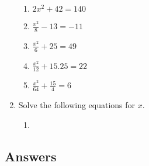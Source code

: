 \documentclass[a4paper,12pt]{article}
\begin{document}
\begin{enumerate}
\begin{multicols}{2}
\begin{enumerate}
    \item $2x^2 + 42 = 140$
    \item $\displaystyle \frac{x^2}{8}-13 = -11$
    \item $\displaystyle \frac{x^2}{6} + 25 = 49$
    \item $\displaystyle \frac{x^2}{12} + 15.25 = 22$
    \item $\displaystyle \frac{x^2}{64} + \frac{15}{4} = 6$
    \end{enumerate}
    \end{multicols}
\item Solve the following equations for $x$.
    \begin{multicols}{2}
    \begin{enumerate}
    \item 
    \end{enumerate}
    \end{multicols}
\end{enumerate}

\newpage
\subsection*{Answers}
\end{document}
